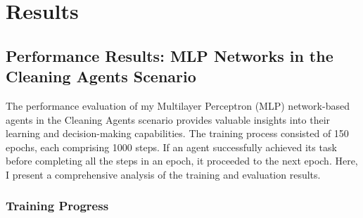 \documentclass{scrartcl}
\begin{document}
\newpage

\section{Results}
\subsection{Performance Results: MLP Networks in the Cleaning Agents Scenario}

The performance evaluation of my Multilayer Perceptron (MLP) network-based agents in the Cleaning Agents scenario provides valuable insights into their learning and decision-making capabilities. The training process consisted of 150 epochs, each comprising 1000 steps. If an agent successfully achieved its task before completing all the steps in an epoch, it proceeded to the next epoch. Here, I present a comprehensive analysis of the training and evaluation results.

\subsubsection{Training Progress}
\end{document}
